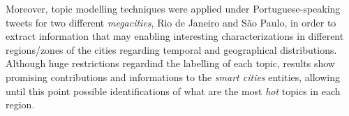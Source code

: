 Moreover, topic modelling techniques were applied under Portuguese-speaking tweets for two different \textit{megacities}, Rio de Janeiro and São Paulo, in order to extract information that may enabling interesting characterizations in different regions/zones of the cities regarding temporal and geographical distributions. Although huge restrictions regardind the labelling of each topic, results show promising contributions and informations to the \textit{smart cities} entities, allowing until this point possible identifications of what are the most \textit{hot} topics in each region.